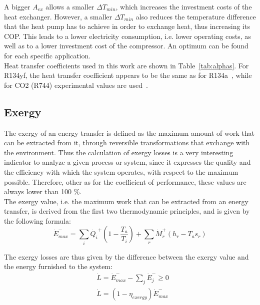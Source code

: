 \documentclass{article}
\begin{document}
A bigger $A_{ex}$ allows a smaller $\Delta T_{min}$, which increases the investment costs of the heat exchanger. However, a smaller $\Delta T_{min}$ also reduces the temperature difference that the heat pump has to achieve in order to exchange heat, thus increasing its COP. This leads to a lower electricity consumption, i.e. lower operating costs, as well as to a lower investment cost of the compressor. An optimum can be found for each specific application.\\

Heat transfer coefficients used in this work are shown in Table~\ref{tab:alphas}. For R134yf, the heat transfer coefficient appears to be the same as for R134a~\cite{wangOverviewHeatTransfer2013}, while for CO2 (R744) experimental values are used~\cite{ohFlowBoilingHeat2011, mastrulloComparisonR744R134a2009}. \\




\subsection{Exergy}\label{ss:exergy}
The exergy of an energy transfer is defined as the maximum amount of work that can be extracted from it, through reversible transformations that exchange with the environment. Thus the calculation of exergy losses is a very interesting indicator to analyze a given process or system, since it expresses the quality and the efficiency with which the system operates, with respect to the maximum possible. Therefore, other as for the coefficient of performance, these values are always lower than 100 \%. \\

The exergy value, i.e. the maximum work that can be extracted from an energy transfer, is derived from the first two thermodynamic principles, and is given by the following formula:
\begin{equation}
    \dot{E}^{-}_{max} = \sum_{i} \dot{Q_i}^{+} (1 - \frac{T_{a}}{T_i} ) + \sum_{r} \dot{M}_{r}^{+} (h_{r} - T_{a} s_{r})    
\end{equation}

The exergy losses are thus given by the difference between the exergy value and the energy furnished to the system:
\begin{align}
	&    \dot{L} = \dot{E}^{-}_{max} - \sum_{j}\dot{E}^{-}_{j} \geq 0 \\
	& 	\dot{L} = (1-\eta_{exergy})\dot{E}^{-}_{max}
\end{align}
\end{document}
